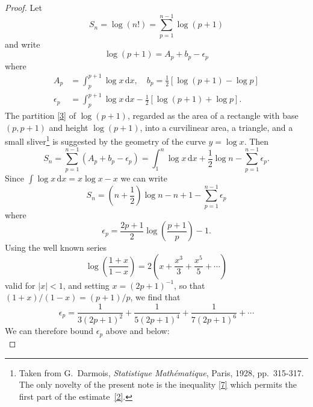 \documentclass[leqno]{article}
\newcommand{\dd}{\,\mathrm{d}}
\begin{document}
\begin{proof}
	Let
	\begin{equation*}
		S_{n}=\log (n !)=\sum_{p=1}^{n-1} \log (p+1)
	\end{equation*}
	and write
	\begin{equation} \label{3}
		\log (p+1)=A_{p}+b_{p}-\epsilon_{p}
	\end{equation}
	where
	\begin{equation*}
		\begin{aligned}
			A_{p} &=\int_{p}^{p+1} \log x \dd x, \quad b_{p}=\frac{1}{2}[\log (p+1)-\log p] \\
			\epsilon_{p} &=\int_{p}^{p+1} \log x \dd x-\frac{1}{2}[\log (p+1)+\log p] .
		\end{aligned}
	\end{equation*}
	The partition \eqref{3} of $\log (p+1)$, regarded as the area of a rectangle with base $(p, p+1)$ and height $\log (p+1)$, into a curvilinear area, a triangle, and a small sliver\footnote{Taken from G.\ Darmois, \emph{Statistique Mathématique}, Paris, 1928, pp.\ 315-317. The only novelty of the present note is the inequality \eqref{7} which permits the first part of the estimate~\eqref{2}.} is suggested by the geometry of the curve $y=\log x$. 
	Then
	\begin{equation*}
		S_{n}=\sum_{p=1}^{n-1}\left(A_{p}+b_{p}-\epsilon_{p}\right)=\int_{1}^{n} \log x \dd x+\frac{1}{2} \log n-\sum_{p=1}^{n-1} \epsilon_{p}.
	\end{equation*}
	Since $\int \log x \dd x=x \log x-x$ we can write
	\begin{equation} \label{4}
		S_{n}=\left(n+\frac{1}{2}\right) \log n-n+1-\sum_{p=1}^{n-1} \epsilon_{p}
	\end{equation}
	where
	\begin{equation*}
		\epsilon_{p}=\frac{2 p+1}{2} \log \left(\frac{p+1}{p}\right)-1.
	\end{equation*}
	Using the well known series
	\begin{equation*}
		\log \left(\frac{1+x}{1-x}\right)=2\left(x+\frac{x^{3}}{3}+\frac{x^{5}}{5}+\cdots\right)
	\end{equation*}
	valid for $|x|<1$, and setting $x=(2 p+1)^{-1}$, so that $(1+x) /(1-x)=(p+1) / p$, we find that
	\begin{equation}
		\label{5}
		\epsilon_{p}=\frac{1}{3(2 p+1)^{2}}+\frac{1}{5(2 p+1)^{4}}+\frac{1}{7(2 p+1)^{6}}+\cdots
	\end{equation}
	We can therefore bound $\epsilon_{p}$ above and below:
	\begin{equation}

\end{equation}
\end{proof}
\end{document}

